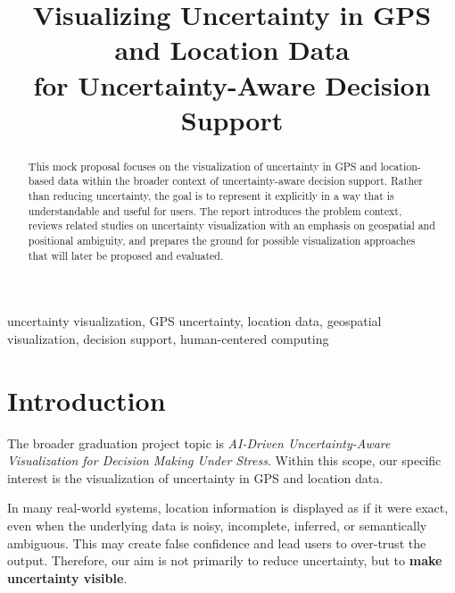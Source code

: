 \documentclass[conference]{IEEEtran}
\begin{document}
\title{Visualizing Uncertainty in GPS and Location Data\\
for Uncertainty-Aware Decision Support}

\author{
}

\maketitle

\begin{abstract}
This mock proposal focuses on the visualization of uncertainty in GPS and location-based data within the broader context of uncertainty-aware decision support. Rather than reducing uncertainty, the goal is to represent it explicitly in a way that is understandable and useful for users. The report introduces the problem context, reviews related studies on uncertainty visualization with an emphasis on geospatial and positional ambiguity, and prepares the ground for possible visualization approaches that will later be proposed and evaluated.
\end{abstract}

\begin{IEEEkeywords}
uncertainty visualization, GPS uncertainty, location data, geospatial visualization, decision support, human-centered computing
\end{IEEEkeywords}

\section{Introduction}

The broader graduation project topic is \textit{AI-Driven Uncertainty-Aware Visualization for Decision Making Under Stress}. Within this scope, our specific interest is the visualization of uncertainty in GPS and location data.

In many real-world systems, location information is displayed as if it were exact, even when the underlying data is noisy, incomplete, inferred, or semantically ambiguous. This may create false confidence and lead users to over-trust the output. Therefore, our aim is not primarily to reduce uncertainty, but to \textbf{make uncertainty visible}.
\end{document}

